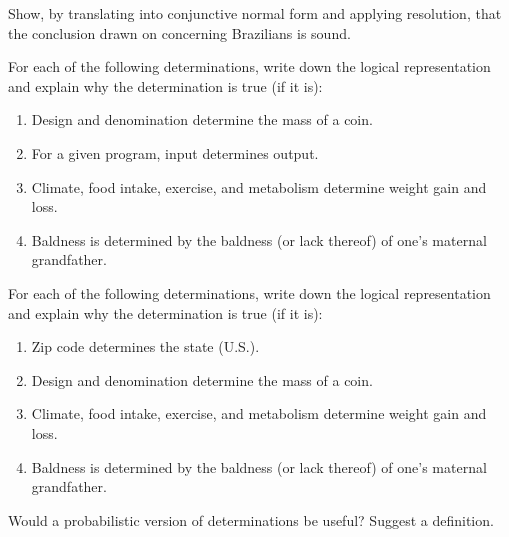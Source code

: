 \setlength{\medskipamount}{1.6\medskipamount}%


\begin{exercise}%
Show, by translating into conjunctive normal form and applying
resolution, that the conclusion drawn on  concerning
Brazilians is sound.
\end{exercise} 



\begin{uexercise}
For each of the following determinations, write down the logical
representation and explain why the determination is true (if it is):
\begin{enumerate}
\item Design and denomination determine the mass of a coin.
\item For a given program, input determines output.
\item Climate, food intake, exercise, and metabolism determine weight gain
and loss.
\item Baldness is determined by the baldness (or lack thereof) of
one's maternal grandfather.
\end{enumerate}
\end{uexercise} 

\begin{iexercise}
For each of the following determinations, write down the logical
representation and explain why the determination is true (if it is):
\begin{enumerate}
\item Zip code determines the state (U.S.).
\item Design and denomination determine the mass of a coin.
\item Climate, food intake, exercise, and metabolism determine weight gain
and loss.
\item Baldness is determined by the baldness (or lack thereof) of
one's maternal grandfather.
\end{enumerate}
\end{iexercise} 

\begin{exercise}
Would a probabilistic version of determinations be useful? Suggest a
definition.
\end{exercise} 


